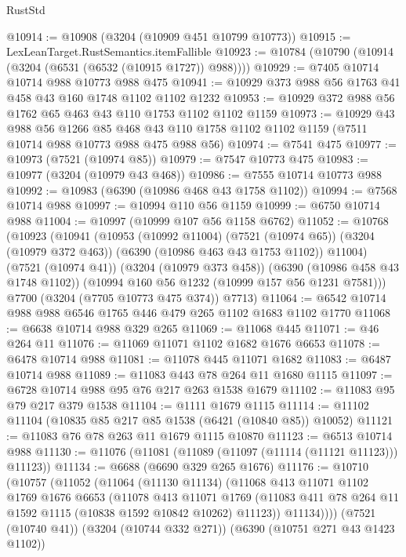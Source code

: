 \begin{lexlean}{RustStd}
\begin{coremodule}
@10914 := @10908 (@3204 (@10909 @451 @10799 @10773))
@10915 := LexLeanTarget.RustSemantics.itemFallible
@10923 := @10784 (@10790 (@10914 (@3204 (@6531 (@6532 (@10915 @1727)) @988))))
@10929 := @7405 @10714 @10714 @988 @10773 @988 @475
@10941 := @10929 @373 @988 @56 @1763 @41 @458 @43 @160 @1748 @1102 @1102 @1232
@10953 := @10929 @372 @988 @56 @1762 @65 @463 @43 @110 @1753 @1102 @1102 @1159
@10973 := @10929
    @43
    @988
    @56
    @1266
    @85
    @468
    @43
    @110
    @1758
    @1102
    @1102
    @1159
    (@7511 @10714 @988 @10773 @988 @475 @988 @56)
@10974 := @7541 @475
@10977 := @10973 (@7521 (@10974 @85))
@10979 := @7547 @10773 @475
@10983 := @10977 (@3204 (@10979 @43 @468))
@10986 := @7555 @10714 @10773 @988
@10992 := @10983 (@6390 (@10986 @468 @43 @1758 @1102))
@10994 := @7568 @10714 @988
@10997 := @10994 @110 @56 @1159
@10999 := @6750 @10714 @988
@11004 := @10997 (@10999 @107 @56 @1158 @6762)
@11052 := @10768
    (@10923
      (@10941
        (@10953
          (@10992 @11004)
          (@7521 (@10974 @65))
          (@3204 (@10979 @372 @463))
          (@6390 (@10986 @463 @43 @1753 @1102))
          @11004)
        (@7521 (@10974 @41))
        (@3204 (@10979 @373 @458))
        (@6390 (@10986 @458 @43 @1748 @1102))
        (@10994 @160 @56 @1232 (@10999 @157 @56 @1231 @7581)))
      @7700
      (@3204 (@7705 @10773 @475 @374))
      @7713)
@11064 := @6542 @10714 @988 @988 @6546 @1765 @446 @479 @265 @1102 @1683 @1102 @1770
@11068 := @6638 @10714 @988 @329 @265
@11069 := @11068 @445
@11071 := @46 @264 @11
@11076 := @11069 @11071 @1102 @1682 @1676 @6653
@11078 := @6478 @10714 @988
@11081 := @11078 @445 @11071 @1682
@11083 := @6487 @10714 @988
@11089 := @11083 @443 @78 @264 @11 @1680 @1115
@11097 := @6728 @10714 @988 @95 @76 @217 @263 @1538 @1679
@11102 := @11083 @95 @79 @217 @379 @1538
@11104 := @1111 @1679 @1115
@11114 := @11102 @11104 (@10835 @85 @217 @85 @1538 (@6421 (@10840 @85)) @10052)
@11121 := @11083 @76 @78 @263 @11 @1679 @1115 @10870
@11123 := @6513 @10714 @988
@11130 := @11076 (@11081 (@11089 (@11097 (@11114 (@11121 @11123))) @11123))
@11134 := @6688 (@6690 @329 @265 @1676)
@11176 := @10710
    (@10757
      (@11052
        (@11064
          (@11130 @11134)
          (@11068
            @413
            @11071
            @1102
            @1769
            @1676
            @6653
            (@11078
              @413
              @11071
              @1769
              (@11083 @411 @78 @264 @11 @1592 @1115 (@10838 @1592 @10842 @10262) @11123))
            @11134))))
    (@7521 (@10740 @41))
    (@3204 (@10744 @332 @271))
    (@6390 (@10751 @271 @43 @1423 @1102))

\end{coremodule}
\end{lexlean}
